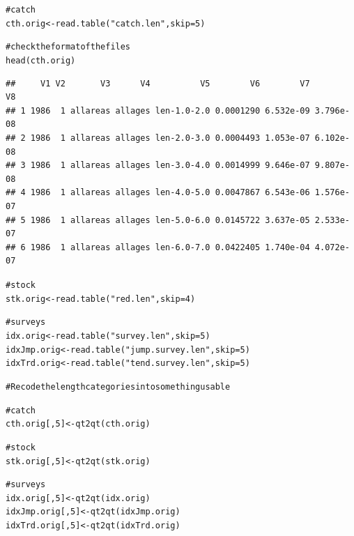 \documentclass[a4paper,english,10pt]{article}\usepackage[]{graphicx}\usepackage[]{color}
\makeatletter
\newcommand{\hlnum}[1]{\textcolor[rgb]{0.2,0.2,0.2}{#1}}%
\newcommand{\hlstr}[1]{\textcolor[rgb]{0.2,0.2,0.2}{#1}}%
\newcommand{\hlcom}[1]{\textcolor[rgb]{0.2,0.267,0.4}{#1}}%
\newcommand{\hlstd}[1]{\textcolor[rgb]{0,0,0}{#1}}%
\newcommand{\hlkwb}[1]{\textcolor[rgb]{0.361,0.506,0.596}{#1}}%
\newcommand{\hlkwc}[1]{\textcolor[rgb]{0.361,0.506,0.596}{#1}}%
\newcommand{\hlkwd}[1]{\textcolor[rgb]{0.361,0.506,0.596}{#1}}%
\newenvironment{kframe}{%
 \def\at@end@of@kframe{}%
 \ifinner\ifhmode%
  \def\at@end@of@kframe{\end{minipage}}%
  \begin{minipage}{\columnwidth}%
 \fi\fi%
 \def\FrameCommand##1{\hskip\@totalleftmargin \hskip-\fboxsep
 \colorbox{shadecolor}{##1}\hskip-\fboxsep
     \hskip-\linewidth \hskip-\@totalleftmargin \hskip\columnwidth}%
 \MakeFramed {\advance\hsize-\width
   \@totalleftmargin\z@ \linewidth\hsize
   \@setminipage}}%
 {\par\unskip\endMakeFramed%
 \at@end@of@kframe}
\newenvironment{knitrout}{}{} %
\makeatother
\begin{document}
\begin{knitrout}
\color{fgcolor}\begin{kframe}
\begin{alltt}
\hlcom{# catch}
\hlstd{cth.orig} \hlkwb{<-} \hlkwd{read.table}\hlstd{(}\hlstr{"catch.len"}\hlstd{,} \hlkwc{skip}\hlstd{=}\hlnum{5}\hlstd{)}

\hlcom{# check the format of the files}
\hlkwd{head}\hlstd{(cth.orig)}
\end{alltt}
\begin{verbatim}
##     V1 V2       V3      V4          V5        V6        V7        V8
## 1 1986  1 allareas allages len-1.0-2.0 0.0001290 6.532e-09 3.796e-08
## 2 1986  1 allareas allages len-2.0-3.0 0.0004493 1.053e-07 6.102e-08
## 3 1986  1 allareas allages len-3.0-4.0 0.0014999 9.646e-07 9.807e-08
## 4 1986  1 allareas allages len-4.0-5.0 0.0047867 6.543e-06 1.576e-07
## 5 1986  1 allareas allages len-5.0-6.0 0.0145722 3.637e-05 2.533e-07
## 6 1986  1 allareas allages len-6.0-7.0 0.0422405 1.740e-04 4.072e-07
\end{verbatim}
\begin{alltt}
\hlcom{# stock}
\hlstd{stk.orig} \hlkwb{<-} \hlkwd{read.table}\hlstd{(}\hlstr{"red.len"}\hlstd{,} \hlkwc{skip}\hlstd{=}\hlnum{4}\hlstd{)}

\hlcom{# surveys}
\hlstd{idx.orig} \hlkwb{<-} \hlkwd{read.table}\hlstd{(}\hlstr{"survey.len"}\hlstd{,} \hlkwc{skip}\hlstd{=}\hlnum{5}\hlstd{)}
\hlstd{idxJmp.orig} \hlkwb{<-} \hlkwd{read.table}\hlstd{(}\hlstr{"jump.survey.len"}\hlstd{,} \hlkwc{skip}\hlstd{=}\hlnum{5}\hlstd{)}
\hlstd{idxTrd.orig} \hlkwb{<-} \hlkwd{read.table}\hlstd{(}\hlstr{"tend.survey.len"}\hlstd{,} \hlkwc{skip}\hlstd{=}\hlnum{5}\hlstd{)}

\hlcom{# Recode the length categories into something usable}

\hlcom{# catch}
\hlstd{cth.orig[,}\hlnum{5}\hlstd{]} \hlkwb{<-} \hlkwd{qt2qt}\hlstd{(cth.orig)}

\hlcom{# stock}
\hlstd{stk.orig[,}\hlnum{5}\hlstd{]} \hlkwb{<-} \hlkwd{qt2qt}\hlstd{(stk.orig)}

\hlcom{# surveys}
\hlstd{idx.orig[,}\hlnum{5}\hlstd{]} \hlkwb{<-} \hlkwd{qt2qt}\hlstd{(idx.orig)}
\hlstd{idxJmp.orig[,}\hlnum{5}\hlstd{]} \hlkwb{<-} \hlkwd{qt2qt}\hlstd{(idxJmp.orig)}
\hlstd{idxTrd.orig[,}\hlnum{5}\hlstd{]} \hlkwb{<-} \hlkwd{qt2qt}\hlstd{(idxTrd.orig)}
\end{alltt}
\end{kframe}
\end{knitrout}
\end{document}
